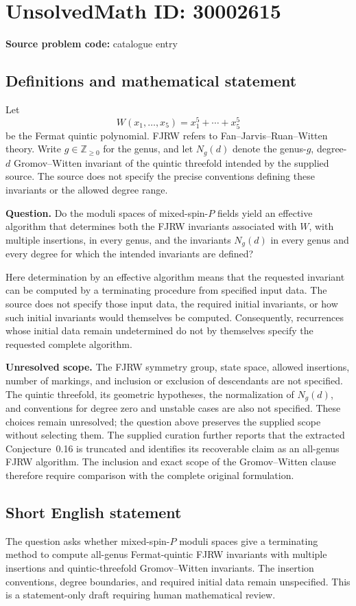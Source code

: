 \documentclass[11pt]{article}
\newcommand{\Z}{\mathbb{Z}}
\begin{document}
\section*{UnsolvedMath ID: 30002615}
\textbf{Source problem code:} catalogue entry
\subsection{Definitions and mathematical statement}
Let
\[
W(x_1,\ldots,x_5)=x_1^5+\cdots+x_5^5
\]
be the Fermat quintic polynomial. FJRW refers to Fan--Jarvis--Ruan--Witten theory. Write \(g\in\Z_{\geq 0}\) for the genus, and let \(N_g(d)\) denote the genus-\(g\), degree-\(d\) Gromov--Witten invariant of the quintic threefold intended by the supplied source. The source does not specify the precise conventions defining these invariants or the allowed degree range.

\textbf{Question.} Do the moduli spaces of mixed-spin-\(P\) fields yield an effective algorithm that determines both the FJRW invariants associated with \(W\), with multiple insertions, in every genus, and the invariants \(N_g(d)\) in every genus and every degree for which the intended invariants are defined?

Here determination by an effective algorithm means that the requested invariant can be computed by a terminating procedure from specified input data. The source does not specify those input data, the required initial invariants, or how such initial invariants would themselves be computed. Consequently, recurrences whose initial data remain undetermined do not by themselves specify the requested complete algorithm.

\textbf{Unresolved scope.} The FJRW symmetry group, state space, allowed insertions, number of markings, and inclusion or exclusion of descendants are not specified. The quintic threefold, its geometric hypotheses, the normalization of \(N_g(d)\), and conventions for degree zero and unstable cases are also not specified. These choices remain unresolved; the question above preserves the supplied scope without selecting them. The supplied curation further reports that the extracted Conjecture~0.16 is truncated and identifies its recoverable claim as an all-genus FJRW algorithm. The inclusion and exact scope of the Gromov--Witten clause therefore require comparison with the complete original formulation.
\subsection{Short English statement}
The question asks whether mixed-spin-\(P\) moduli spaces give a terminating method to compute all-genus Fermat-quintic FJRW invariants with multiple insertions and quintic-threefold Gromov--Witten invariants. The insertion conventions, degree boundaries, and required initial data remain unspecified. This is a statement-only draft requiring human mathematical review.
\end{document}
